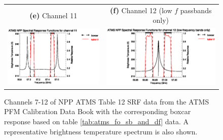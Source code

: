 \begin{figure}[H]
\begin{tabular}{c c}
    \textsf{\textbf{(e)} Channel 11} &
    \textsf{\textbf{(f)} Channel 12 (low $f$ passbands only)} \\
    \includegraphics[bb=70 400 300 559,clip,scale=1.0]{graphics/srf/table12/atms_npp.ch11.osrf.eps} &
    \includegraphics[bb=70 400 300 559,clip,scale=1.0]{graphics/srf/table12/atms_npp.ch12.osrf.eps}
  \end{tabular}
  \caption{Channels 7-12 of NPP ATMS Table 12 SRF data from the ATMS PFM Calibration Data Book\cite{ATMS_PFM_CalLog} with the corresponding boxcar response based on table \ref{tab:atms_fo_sb_and_df} data. A representative brightness temperature spectrum is also shown.}
  \label{fig:atms_npp.table12.ch7-12.osrf}
\end{figure}

